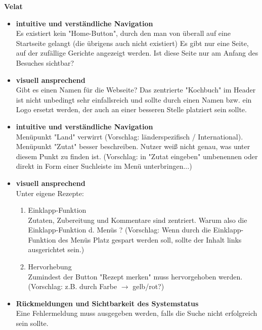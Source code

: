 \documentclass[parskip,10pt,abstracton]{scrartcl}
\begin{document}
\textbf{Velat}\\
\begin{itemize}
\item \textbf{intuitive und verständliche Navigation}\\ 
Es existiert kein "Home-Button", durch den man von überall auf eine Startseite gelangt (die übrigens auch nicht existiert)
Es gibt nur eine Seite, auf der zufällige Gerichte angezeigt werden. Ist diese Seite nur am Anfang des Besuches sichtbar?

\item \textbf{visuell ansprechend}\\
Gibt es einen Namen für die Webseite? Das zentrierte "Kochbuch" im Header ist nicht unbedingt sehr einfallsreich und sollte durch einen Namen bzw. ein Logo ersetzt werden, der auch an einer besseren Stelle platziert sein sollte. 

\item \textbf{intuitive und verständliche Navigation}\\
Menüpunkt "Land" verwirrt (Vorschlag: länderspezifisch / International).          
Menüpunkt "Zutat" besser beschreiben. Nutzer weiß nicht genau, was unter diesem Punkt zu finden ist.
(Vorschlag: in "Zutat eingeben" umbenennen oder direkt in Form einer Suchleiste im Menü unterbringen...)


\item \textbf{visuell ansprechend}\\
Unter eigene Rezepte:
\begin{enumerate}[o]
\item  Einklapp-Funktion\\
Zutaten, Zubereitung und Kommentare sind zentriert. 
Warum also die Einklapp-Funktion d. Menüs ?
(Vorschlag: Wenn durch die Einklapp-Funktion des Menüs Platz gespart werden soll, sollte der Inhalt links ausgerichtet sein.)
\item Hervorhebung\\
Zumindest der Button "Rezept merken" muss hervorgehoben werden. 
(Vorschlag: z.B. durch Farbe $\rightarrow$ gelb/rot?) 
\end{enumerate}

\item \textbf{Rückmeldungen und Sichtbarkeit des Systemstatus}\\
Eine Fehlermeldung muss ausgegeben werden, falls die Suche nicht erfolgreich sein sollte.

\end{itemize}
\end{document}
